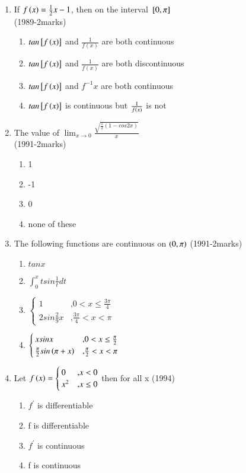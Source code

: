 \documentclass[journal]{IEEEtran}
\numberwithin{equation}{enumi}
\numberwithin{figure}{enumi}
\begin{document}
\begin{enumerate}
\begin{enumerate}
			\end{enumerate}
		\item If $f\left(x\right) = \frac{1}{2}x-1$, then on the interval ${}\left[0,\pi\right]$ \\ \hfill{(1989-2marks)}
			\begin{enumerate}
				\item $tan{}\left[f\left(x\right)\right]$ and $\frac{1}{f(x)}$ are both continuous
				\item $tan{}\left[f\left(x\right)\right]$ and $\frac{1}{f(x)}$ are both discontinuous
				\item $tan{}\left[f\left(x\right)\right]$ and $f^{-1}x$ are both continuous
				\item $tan{}\left[f\left(x\right)\right]$ is continuous but $\frac{1}{f\left(x\right)}$ is not \\
			\end{enumerate}
		\item The value of $\lim_{x\to0}{\frac{\sqrt{\frac{1}{2}(1-cos2x)}}{x}}$ \\ \hfill{(1991-2marks)}
			\begin{enumerate}
				\item 1
				\item -1
				\item 0
				\item none of these \\
			\end{enumerate}
		\item The following functions are continuous on $\left(0,\pi\right)$ \hfill{(1991-2marks)}
			\begin{enumerate}
				\item $tanx$
				\item $\int_{0}^{x}tsin\frac{1}{t}dt$ 
				\item $\begin{cases} 1 & \text{,} 0<x\leq\frac{3\pi}{4} \\
						2sin\frac{2}{9}x & \text{,} \frac{3\pi}{4}<x<\pi \end{cases}$
					\item $\begin{cases} xsinx & \text{,} 0<x\leq\frac{\pi}{2} \\ \frac{\pi}{2}sin\left(\pi+x\right) & \text{,} \frac{\pi}{2}<x<\pi \\ \end{cases}$
			\end{enumerate}
		\item Let $f\left(x\right)=\begin{cases} 0 & \text{,} x<0 \\
                             x^2 & \text{,} x\leq0 \end{cases}$ then for all x \hfill{(1994)}
			     \begin{enumerate}
				     \item $f^\prime$ is differentiable
				     \item f is differentiable
				     \item $f^\prime$ is continuous
				     \item f is continuous
			     \end{enumerate}


\end{enumerate}
\end{document}
